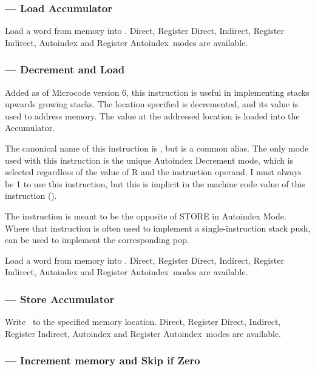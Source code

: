 \newcommand\AMGroupOne{Direct, Register Direct, Indirect, Register Indirect,
  Autoindex and Register Autoindex\ }

\newcommand\AMGroupTwo{Address, Register Address, Indirect Address, Register
  Indirect Address, Autoindex Address, and Register Autoindex Address\ }

\subsubsection{ — Load Accumulator}
\label{sec:instruction-LOAD}

Load a word from memory into \A. \AMGroupOne modes are available.

\subsubsection{ — Decrement and Load}

Added as of Microcode version 6, this instruction is useful in implementing
stacks upwards growing stacks. The location specified is decremented, and its
value is used to address memory. The value at the addressed location is loaded
into the Accumulator.

The canonical name of this instruction is , but  is a common
alias. The only mode used with this instruction is the unique Autoindex
Decrement mode, which is selected regardless of the value of R and the
instruction operand. I must always be 1 to use this instruction, but this is
implicit in the machine code value of this instruction ().

The instruction is meant to be the opposite of {\asm STORE} in Autoindex
Mode. Where that instruction is often used to implement a single-instruction
stack push,  can be used to implement the corresponding pop.

\label{sec:instruction-LOAD}

Load a word from memory into \A. \AMGroupOne modes are available.

\subsubsection{ — Store Accumulator}
\label{sec:instruction-STORE}

Write \A\ to the specified memory location. \AMGroupOne modes are available.

\subsubsection{ — Increment memory and Skip if Zero}
\label{sec:instruction-ISZ}

